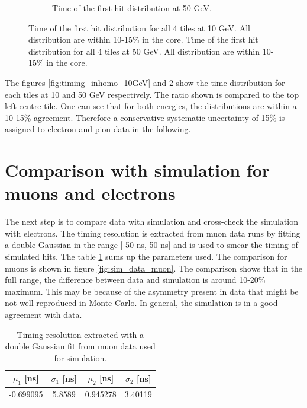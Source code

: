 \begin{figure}[t]
\begin{subfigure}[t]{0.45\textwidth}
		\caption{Time of the first hit distribution at 50 GeV.}\label{fig:timing_inhomo_50GeV}
	\end{subfigure}
	\caption{ Time of the first hit distribution for all 4 tiles at 10 GeV. All distribution are within 10-15\% in the core.  Time of the first hit distribution for all 4 tiles at 50 GeV. All distribution are within 10-15\% in the core.}
\end{figure}
The figures \ref{fig:timing_inhomo_10GeV} and \ref{fig:timing_inhomo_50GeV} show the time distribution for each tiles at 10 and 50 GeV respectively. The ratio shown is compared to the top left centre tile. One can see that for both energies, the distributions are within a 10-15\% agreement. Therefore a conservative systematic uncertainty of 15\% is assigned to electron and pion data in the following.

\section{Comparison with simulation for muons and electrons}

The next step is to compare data with simulation and cross-check the simulation with electrons. The timing resolution is extracted from muon data runs by fitting a double Gaussian in the range [-50 ns, 50 ns] and is used to smear the timing of simulated hits. The table \ref{table:time_res_sim} sums up the parameters used. The comparison for muons is shown in figure \ref{fig:sim_data_muon}. The comparison shows that in the full range, the difference between data and simulation is around 10-20\% maximum. This may be because of the asymmetry present in data that might be not well reproduced in Monte-Carlo. In general, the simulation is in a good agreement with data.

\begin{table}[t]
	\centering
	\caption[Timing resolution extracted with a double Gaussian fit from muon data used for simulation.]{Timing resolution extracted with a double Gaussian fit from muon data used for simulation.\footnotemark[1]}
	\label{table:time_res_sim}
	\begin{tabular}{@{} cccc @{}}
		\hline
		$\mu_{1}$ [ns] & $\sigma_{1}$ [ns] & $\mu_{2}$ [ns] & $\sigma_{2}$ [ns] \\
		\hline
		-0.699095 & 5.8589 & 0.945278 & 3.40119 \\
		\hline
	\end{tabular}
\end{table}

